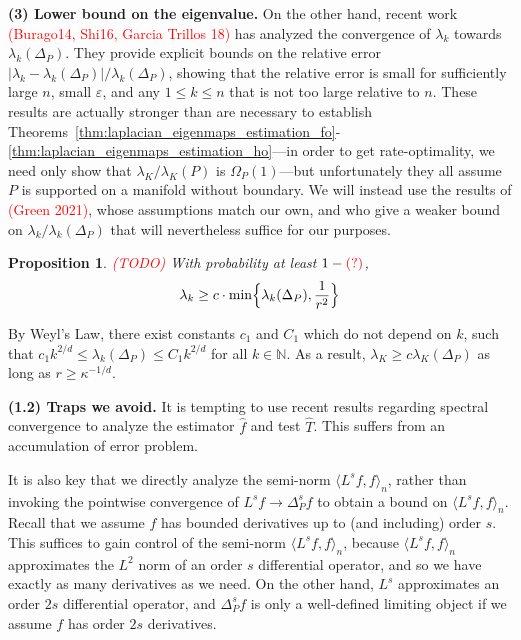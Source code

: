 \documentclass{article}
\newcommand{\1}{\mathbf{1}}
\newcommand{\Leb}{L}
\newcommand{\dotp}[2]{\langle #1, #2 \rangle}
\newcommand{\wh}[1]{\widehat{#1}}
\theoremstyle{alden}
\theoremstyle{aldenthm}
\newtheorem{proposition}{Proposition}
\theoremstyle{definition}
\theoremstyle{remark}
\begin{document}
\textbf{(3) Lower bound on the eigenvalue.} On the other hand, recent work \textcolor{red}{(Burago14, Shi16, Garcia Trillos 18)} has analyzed the convergence of $\lambda_{k}$ towards $\lambda_{k}(\Delta_P)$. They provide explicit bounds on the relative error $|\lambda_{k} - \lambda_{k}(\Delta_P)|/\lambda_{k}(\Delta_P)$, showing that the relative error is small for sufficiently large $n$, small $\varepsilon$, and any $1 \leq k \leq n$ that is not too large relative to $n$. These results are actually stronger than are necessary to establish Theorems~\ref{thm:laplacian_eigenmaps_estimation_fo}-\ref{thm:laplacian_eigenmaps_estimation_ho}---in order to get rate-optimality, we need only show that $\lambda_{K}/\lambda_K(P)$ is $\Omega_P(1)$---but unfortunately they all assume $P$ is supported on a manifold without boundary. We will instead use the results of \textcolor{red}{(Green 2021)}, whose assumptions match our own, and who give a weaker bound on $\lambda_k/\lambda_k(\Delta_P)$ that will nevertheless suffice for our purposes. 

\begin{proposition}
	\label{prop:graph_eigenvalue}
	\textcolor{red}{(TODO)}
	With probability at least $1 - \textcolor{red}{(?)}$,
	\begin{equation*}
	\lambda_k \geq c \cdot \min\Bigl\{\lambda_k(\Delta_P), \frac{1}{r^{2}} \Bigr\}
	\end{equation*}
\end{proposition}
By Weyl's Law, there exist constants $c_1$ and $C_1$ which do not depend on $k$, such that $c_1 k^{2/d} \leq \lambda_{k}(\Delta_P) \leq C_1 k^{2/d}$ for all $k \in \mathbb{N}$. As a result, $\lambda_{K} \geq c \lambda_{K}(\Delta_P)$ as long as $r \geq \kappa^{-1/d}$. 

\textbf{(1.2) Traps we avoid.} It is tempting to use recent results regarding spectral convergence to analyze the estimator $\wh{f}$ and test $\wh{T}$. This suffers from an accumulation of error problem. 

It is also key that we directly analyze the semi-norm $\dotp{L^s f}{f}_n$, rather than invoking the pointwise convergence of $L^{s}f \to \Delta_P^{s}f$ to obtain a bound on $\dotp{L^s f}{f}_n$. Recall that we assume $f$ has bounded derivatives up to (and including) order $s$. This suffices to gain control of the semi-norm $\dotp{L^s f}{f}_n$, because $\dotp{L^s f}{f}_n$ approximates the $\Leb^2$ norm of an order $s$ differential operator, and so we have exactly as many derivatives as we need. On the other hand, $L^s$ approximates an order $2s$ differential operator, and $\Delta_P^sf$ is only a well-defined limiting object if we assume $f$ has order $2s$ derivatives. 
\end{document}
